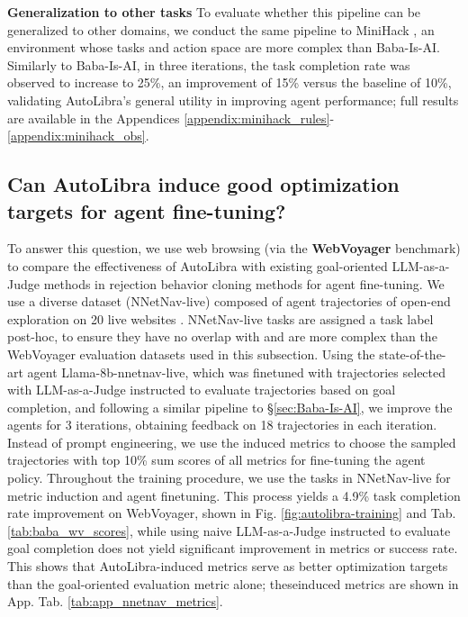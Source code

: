 \textbf{Generalization to other tasks} To evaluate whether this pipeline can be generalized to other domains, we conduct the same pipeline to MiniHack \citep{samvelyan2021minihackplanetsandboxopenended}, an environment whose tasks and action space are more complex than Baba-Is-AI. Similarly to Baba-Is-AI, in three iterations, the task completion rate was observed to increase to 25\%, an improvement of 15\% versus the baseline of 10\%, validating AutoLibra's general utility in improving agent performance; full results are available in the Appendices \ref{appendix:minihack_rules}-\ref{appendix:minihack_obs}.


\subsection{Can AutoLibra induce good optimization targets for agent fine-tuning?}
\label{sec:webvoyager}
To answer this question, we use web browsing (via the \textbf{WebVoyager} \citep{he2024webvoyager} benchmark) to compare the effectiveness of AutoLibra with existing goal-oriented LLM-as-a-Judge methods in rejection behavior cloning methods for agent fine-tuning.
We use a diverse dataset (NNetNav-live) composed of agent trajectories of open-end exploration on 20 live websites \citep{Murty2025NNetNav}. 
NNetNav-live tasks are assigned a task label post-hoc, to ensure they have no overlap with and are more complex than the WebVoyager evaluation datasets used in this subsection.
Using the state-of-the-art agent Llama-8b-nnetnav-live, which was finetuned with trajectories selected with LLM-as-a-Judge instructed to evaluate trajectories based on goal completion, and following a similar pipeline to \S\ref{sec:Baba-Is-AI}, we improve the agents for 3 iterations, obtaining feedback on 18 trajectories in each iteration. Instead of prompt engineering, we use the induced metrics to choose the sampled trajectories with top 10\% sum scores of all metrics for fine-tuning the agent policy. Throughout the training procedure, we use the tasks in NNetNav-live \citep{Murty2025NNetNav} for metric induction and agent finetuning. This process yields a 4.9\% task completion rate improvement on WebVoyager, shown in Fig. \ref{fig:autolibra-training} and Tab. \ref{tab:baba_wv_scores}, while using naive LLM-as-a-Judge instructed to evaluate goal completion does not yield significant improvement in metrics or success rate. This shows that AutoLibra-induced metrics serve as better optimization targets than the goal-oriented evaluation metric alone; theseinduced metrics are shown in App. Tab. \ref{tab:app_nnetnav_metrics}.